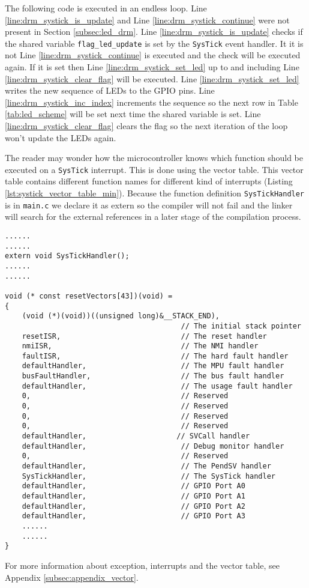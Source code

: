 The following code is executed in an endless loop.
Line \ref{line:drm_systick_is_update} and Line \ref{line:drm_systick_continue} were not present in Section \ref{subsec:led_drm}.
Line \ref{line:drm_systick_is_update} checks if the shared variable \texttt{flag\_led\_update} is set by the \texttt{SysTick} event handler. It it is not Line \ref{line:drm_systick_continue} is executed and the check will be executed again.
If it is set then Line \ref{line:drm_systick_set_led} up to and including Line \ref{line:drm_systick_clear_flag} will be executed.
Line \ref{line:drm_systick_set_led} writes the new sequence of LEDs to the GPIO pins.
Line \ref{line:drm_systick_inc_index} increments the sequence so the next row in Table \ref{tab:led_scheme} will be set next time the shared variable is set.
Line \ref{line:drm_systick_clear_flag} clears the flag so the next iteration of the loop won't update the LEDs again.

The reader may wonder how the microcontroller knows which function should be executed on a \texttt{SysTick} interrupt.
This is done using the vector table. This vector table contains different function names for different kind of interrupts (Listing \ref{lst:systick_vector_table_min}).
Because the function definition \texttt{SysTickHandler} is in \texttt{main.c} we declare it as extern so the compiler will not fail and the linker will search for the external references in a later stage of the compilation process.

\begin{lstlisting}[style=CStyle, caption={Part of \texttt{cc3220\_startup\_ccs.c} which contains a part of the vector table}, captionpos=b, label={lst:systick_vector_table_min}, escapechar=@]
......
......
extern void SysTickHandler();
......
......

void (* const resetVectors[43])(void) =
{
    (void (*)(void))((unsigned long)&__STACK_END),
                                         // The initial stack pointer
    resetISR,                            // The reset handler
    nmiISR,                              // The NMI handler
    faultISR,                            // The hard fault handler
    defaultHandler,                      // The MPU fault handler
    busFaultHandler,                     // The bus fault handler
    defaultHandler,                      // The usage fault handler
    0,                                   // Reserved
    0,                                   // Reserved
    0,                                   // Reserved
    0,                                   // Reserved
    defaultHandler,                     // SVCall handler
    defaultHandler,                      // Debug monitor handler
    0,                                   // Reserved
    defaultHandler,                      // The PendSV handler
    SysTickHandler,                      // The SysTick handler
    defaultHandler,                      // GPIO Port A0
    defaultHandler,                      // GPIO Port A1
    defaultHandler,                      // GPIO Port A2
    defaultHandler,                      // GPIO Port A3
    ......
    ......
}

\end{lstlisting}

For more information about exception, interrupts and the vector table, see Appendix \ref{subsec:appendix_vector}.
